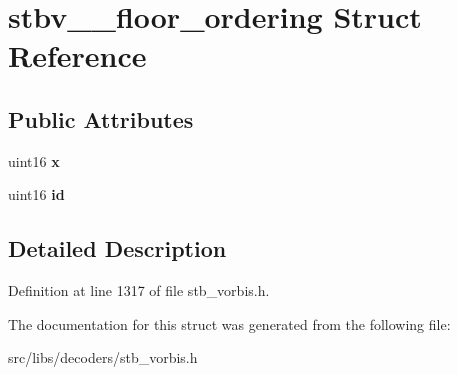 \hypertarget{structstbv____floor__ordering}{\section{stbv\-\_\-\-\_\-floor\-\_\-ordering Struct Reference}
\label{structstbv____floor__ordering}
}
\subsection*{Public Attributes}
\begin{DoxyCompactItemize}
\item 
\hypertarget{structstbv____floor__ordering_ae924c7a53744c143820b8ca1f82eb591}{uint16 {\bfseries x}}\label{structstbv____floor__ordering_ae924c7a53744c143820b8ca1f82eb591}

\item 
\hypertarget{structstbv____floor__ordering_afc029b834baf4e8b8c7b9016411006f7}{uint16 {\bfseries id}}\label{structstbv____floor__ordering_afc029b834baf4e8b8c7b9016411006f7}

\end{DoxyCompactItemize}


\subsection{Detailed Description}


Definition at line 1317 of file stb\-\_\-vorbis.\-h.



The documentation for this struct was generated from the following file\-:\begin{DoxyCompactItemize}
\item 
src/libs/decoders/stb\-\_\-vorbis.\-h\end{DoxyCompactItemize}
